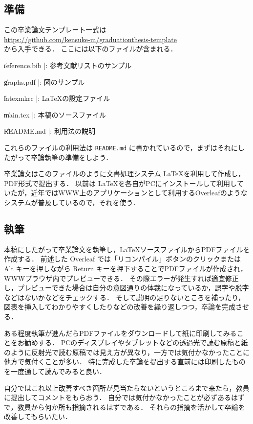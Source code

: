 \documentclass[a4paper,twocolumn,10pt]{ltjsarticle}
\begin{document}
\subsection{準備}

この卒業論文テンプレート一式は\\
\url{https://github.com/kensuke-m/graduationthesis-template}\\
から入手できる．
ここには以下のファイルが含まれる．
\begin{Enumerate}
 \item \|reference.bib |: 参考文献リストのサンプル
 \item \|graphs.pdf    |: 図のサンプル
 \item \|latexmkrc     |: \LaTeX の設定ファイル
 \item \|main.tex      |: 本稿のソースファイル
 \item \|README.md     |: 利用法の説明
\end{Enumerate}
これらのファイルの利用法は {\tt README.md} に書かれているので，まずはそれにしたがって卒論執筆の準備をしよう．

卒業論文はこのファイルのように文書処理システム \LaTeX を利用して作成し，PDF形式で提出する．
以前は \LaTeX を各自がPCにインストールして利用していたが，近年ではWWW上のアプリケーションとして利用するOverleaf\cite{refwww}のようなシステムが普及しているので，それを使う．

\subsection{執筆}

本稿にしたがって卒業論文を執筆し，\LaTeX ソースファイルからPDFファイルを作成する．
前述した Overleaf では「リコンパイル」ボタンのクリックまたは Alt キーを押しながら Return キーを押下することでPDFファイルが作成され，WWWブラウザ内でプレビューできる．
その際エラーが発生すれば適宜修正し，プレビューできた場合は自分の意図通りの体裁になっているか，誤字や脱字などはないかなどをチェックする．
そして説明の足りないところを補ったり，図表を挿入してわかりやすくしたりなどの改善を繰り返しつつ，卒論を完成させる．

ある程度執筆が進んだらPDFファイルをダウンロードして紙に印刷してみることをお勧めする．
PCのディスプレイやタブレットなどの透過光で読む原稿と紙のように反射光で読む原稿では見え方が異なり，一方では気付かなかったことに他方で気付くことが多い．
特に完成した卒論を提出する直前には印刷したものを一度通して読んでみると良い．

自分ではこれ以上改善すべき箇所が見当たらないというところまで来たら，教員に提出してコメントをもらおう．
自分では気付かなかったことが必ずあるはずで，教員から何か所も指摘されるはずである．
それらの指摘を活かして卒論を改善してもらいたい．
\end{document}

